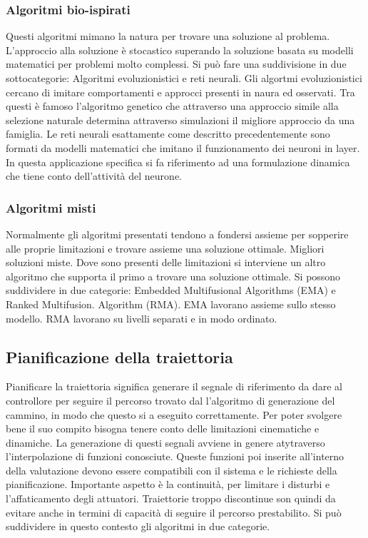 \subsubsection{Algoritmi bio-ispirati}
Questi algoritmi mimano la natura per trovare una soluzione al problema. L'approccio alla soluzione è stocastico superando la soluzione basata su modelli matematici per problemi molto complessi.
Si può fare una suddivisione in due sottocategorie: Algoritmi evoluzionistici e reti neurali.
Gli algortmi evoluzionistici cercano di imitare comportamenti e approcci presenti in naura ed osservati. Tra questi è famoso l'algoritmo genetico che attraverso una approccio simile alla selezione naturale determina attraverso simulazioni il migliore approccio da una famiglia.
Le reti neurali esattamente come descritto precedentemente sono formati da modelli matematici che imitano il funzionamento dei neuroni in layer. In questa applicazione specifica si fa riferimento ad una formulazione dinamica che tiene conto dell'attività del neurone.

\subsubsection{Algoritmi misti}
Normalmente gli algoritmi presentati tendono a fondersi assieme per sopperire alle proprie limitazioni e trovare assieme una soluzione ottimale. Migliori soluzioni miste. Dove sono presenti delle limitazioni si interviene un altro algoritmo che supporta il primo a trovare una soluzione ottimale.	Si possono suddividere in due categorie: Embedded Multifusional Algorithms (EMA) e Ranked Multifusion. Algorithm (RMA).
EMA lavorano assieme sullo stesso modello.
RMA lavorano su livelli separati e in modo ordinato.


\subsection{Pianificazione della traiettoria}
Pianificare la traiettoria significa generare il segnale di riferimento da dare al controllore per seguire il percorso trovato dal l'algoritmo di generazione del cammino, in modo che questo si a eseguito correttamente. Per poter svolgere bene il suo compito bisogna tenere conto delle limitazioni cinematiche e dinamiche. La generazione di questi segnali avviene in genere atytraverso l'interpolazione di funzioni conosciute. Queste funzioni poi inserite all'interno della valutazione devono essere compatibili con il sistema e le richieste della pianificazione. Importante aspetto è la continuità, per limitare i disturbi e l'affaticamento degli attuatori. Traiettorie troppo discontinue son quindi da evitare anche in termini di capacità di seguire il percorso prestabilito.
Si può suddividere in questo contesto gli algoritmi in due categorie.
